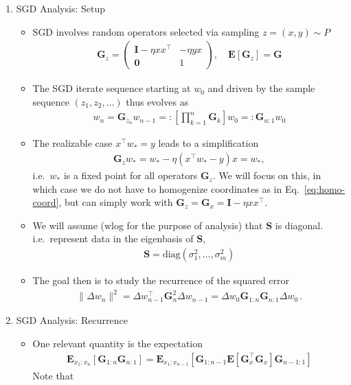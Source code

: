 \documentclass{article}
\newcommand{\E}{{\mathbf E}}
\newcommand{\mI}{{\mathbf I}}
\newcommand{\mS}{{\mathbf S}}
\newcommand{\mG}{{\mathbf G}}
\begin{document}
\begin{enumerate}
\item SGD Analysis: Setup
\begin{itemize}
\item SGD involves random operators selected via sampling $z=(x,y) \sim P$
\begin{align}
\mG_{z} = \begin{pmatrix} \mI - \eta xx^\top & - \eta y x  \\   \mathbf 0 & 1 \end{pmatrix}, \quad \E[\mG_{z}] = \mG 
\label{eq:homo-coord}
\end{align}
\item The SGD iterate sequence starting at $w_0$ and driven by the sample sequence $(z_1, z_2, \dots)$ thus evolves as
\begin{align}
w_{n} = \mG_{z_n} w_{n-1} =: \left[ \prod_{k=1}^n \mG_{k} \right] w_{0} =: \mG_{n:1} w_0
\end{align}
\item The realizable case $x^\top w_* = y$ leads to a simplification
\begin{align}
\mG_{z} w_* = w_* - \eta \left(x^\top w_* - y \right)x = w_*,
\end{align}
i.e.~$w_*$ is a fixed point for all operators $\mG_z$. We will focus on this, in which case we do not have to homogenize coordinates as in Eq.~\eqref{eq:homo-coord}, but can simply work with $\mG_z = \mG_x = \mI - \eta xx^\top$. 
\item 
We will assume (wlog for the purpose of analysis) that $\mS$ is diagonal. i.e.~represent data in the eigenbasis of $\mS$,
\begin{align}
\mS = \text{diag}(\sigma_1^2, \dots, \sigma_m^2)
\end{align} 
\item  The goal then is to study the recurrence of the squared  error 
\begin{align}
\| \Delta w_n \|^2= \Delta w_{n-1}^\top \mG_n^2 \Delta w_{n-1}
= \Delta w_0 \mG_{1:n} \mG_{n:1} \Delta w_0
\,.
\end{align}
\end{itemize}
\item SGD Analysis: Recurrence 
\begin{itemize}
\item One relevant quantity is the expectation
\begin{align}
\E_{x_1:x_n}[\mG_{1:n} \mG_{n:1} ] = \E_{x_1:x_{n-1}} [ \mG_{1:n-1} \E[\mG_x^\top \mG_x] \mG_{n-1:1} ]
\end{align}
Note that 

\end{itemize}
\end{enumerate}
\end{document}
